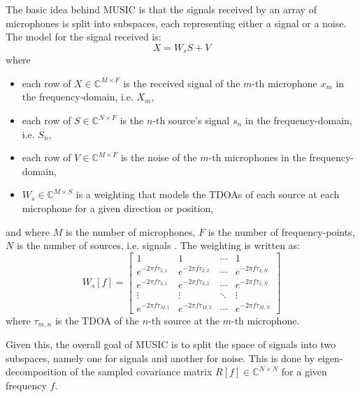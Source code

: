 \documentclass{report}
\begin{document}
The basic idea behind MUSIC is that the signals received by an array of microphones is split into subspaces, each representing either a signal or a noise. The model for the signal received is:
\begin{equation}
X = W_s S + V
\end{equation}
where 
\begin{itemize}
	\item each row of $X\in \mathbb{C}^{M\times F}$ is the received signal of the $m$-th microphone $x_m$ in the frequency-domain, i.e. $X_m$,
	\item each row of $S\in \mathbb{C}^{N\times F}$ is the $n$-th source's signal $s_n$ in the frequency-domain, i.e. $S_n$,
	\item each row of $V\in \mathbb{C}^{M\times F}$ is the noise of the $m$-th microphones in the frequency-domain,
	\item $W_s\in \mathbb{C}^{M\times S}$ is a weighting that models the TDOAs of each source at each microphone for a given direction or position,
\end{itemize}
and where $M$ is the number of microphones, $F$ is the number of frequency-points, $N$ is the number of sources, i.e. signals \cite{rascon_localization_2017}. The weighting is written as:
\begin{equation}
W_s[f] = 
\begin{bmatrix}
	1 						& 1						& \cdots		& 1						\\
	e^{-2\pi f\tau_{2,1}}	& e^{-2\pi f\tau_{2,2}}	& \cdots		& e^{-2\pi f\tau_{2,N}}	\\
	e^{-2\pi f\tau_{3,1}}	& e^{-2\pi f\tau_{3,2}}	& \cdots		& e^{-2\pi f\tau_{3,N}}	\\
	\vdots					& \vdots					& \ddots		& \vdots					\\
	e^{-2\pi f\tau_{M,1}}	& e^{-2\pi f\tau_{M,2}}	& \cdots		& e^{-2\pi f\tau_{M,N}}
\end{bmatrix}
\end{equation}
where $\tau_{m,n}$ is the TDOA of the $n$-th source at the $m$-th microphone.

Given this, the overall goal of MUSIC is to split the space of signals into two subspaces, namely one for signals and another for noise. This is done by eigen-decomposition of the sampled covariance matrix $R[f]\in \mathbb{C}^{N\times N}$ for a given frequency $f$.
\end{document}
